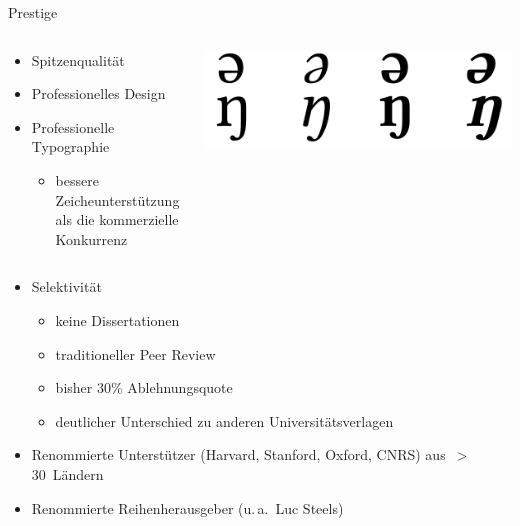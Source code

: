 \documentclass[final]{beamer}
\begin{document}
\begin{frame}{}
\begin{columns}[t]
\begin{column}{.45\linewidth}
    \begin{block}{Prestige}
      \begin{columns}
	\begin{column}{.48\linewidth}
	  \begin{itemize}
	    \item Spitzenqualit{\"a}t
	    \item Professionelles Design 
	    \item Professionelle Typographie
	    \begin{itemize}
	      \item bessere Zeicheunterst{\"u}tzung als die kommerzielle Konkurrenz
	    \end{itemize}
	  \end{itemize}
	\end{column}
	\begin{column}{.48\linewidth} 
	  \includegraphics[width=.7\linewidth]{schwaengma.png}
	\end{column}
      \end{columns} 

      \begin{itemize}
	\item Selektivit{\"a}t
	  \begin{itemize}
	    \item keine Dissertationen
	    \item traditioneller Peer Review
	    \item bisher 30\% Ablehnungsquote
	    \item deutlicher Unterschied zu anderen Universit{\"a}tsverlagen
	  \end{itemize}
	\item Renommierte Unterst{\"u}tzer (Harvard, Stanford, Oxford, CNRS) \mbox{aus $>$30 L{\"a}ndern}
	\item Renommierte Reihenherausgeber (u.\,a.\ Luc Steels)
      \end{itemize}
    \end{block}


\end{column}
\end{columns}
\end{frame}
\end{document}
